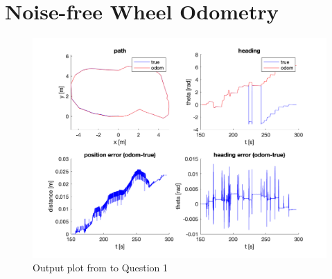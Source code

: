 \documentclass{article} %
\begin{document}
{} %

\section{Noise-free Wheel Odometry} %
\begin{figure}[hbt]
  \centering
    \includegraphics[width=1.0\textwidth]{ass1_q1.png}
  \caption{Output plot from to Question 1}
\end{figure}
\end{document}
